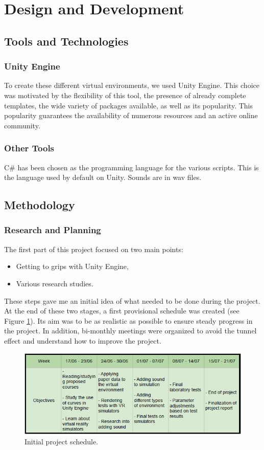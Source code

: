 \documentclass[american]{acmtog} %
\begin{document}
\section{Design and Development}
\label{sec:design}
\subsection{Tools and Technologies}
\subsubsection{Unity Engine}
To create these different virtual environments, we used Unity Engine. This choice was motivated by the flexibility of this tool, the presence of already complete templates, the wide variety of packages available, as well as its popularity. This popularity guarantees the availability of numerous resources and an active online community.

\subsubsection{Other Tools}
C\# has been chosen as the programming language for the various scripts. This is the language used by default on Unity. Sounds are in wav files.

\subsection{Methodology}

\subsubsection{Research and Planning}
The first part of this project focused on two main points:
\begin{itemize}[label=\textbullet]
    \item Getting to grips with Unity Engine,
    \item Various research studies.
\end{itemize}
These steps gave me an initial idea of what needed to be done during the project. At the end of these two stages, a first provisional schedule was created (see Figure \ref{fig:planning}). Its aim was to be as realistic as possible to ensure steady progress in the project. In addition, bi-monthly meetings were organized to avoid the tunnel effect and understand how to improve the project.

\begin{figure}[H]
\centerline{\includegraphics[width=\columnwidth]{figures/Planning.png}}
\caption{Initial project schedule.}
    \label{fig:planning}
\end{figure}
\end{document}
